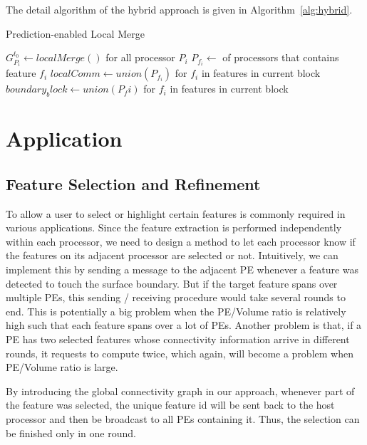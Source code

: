 \documentclass[10pt, conference, compsocconf]{IEEEtran}
\begin{document}
The detail algorithm of the hybrid approach is given in Algorithm~\ref{alg:hybrid}.
\begin{algorithm}
\caption{Prediction-enabled Local Merge}
\label{alg:hybrid}
	\begin{algorithmic}[1]
			\STATE $G_{P_i}^{t_0} \leftarrow localMerge()$ for all processor $P_i$
			\STATE $P_{f_i} \leftarrow$ of processors that contains feature $f_i$
			\STATE $localComm \leftarrow union(P_{f_i})$ for $f_i$ in features in current block
		\ELSE
			\STATE $boundary_block \leftarrow union(P_fi)$ for $f_i$ in features in current block
		\ENDIF
	\end{algorithmic}
\end{algorithm}

\section{Application}

\subsection{Feature Selection and Refinement}
To allow a user to select or highlight certain features is commonly required in various applications. 
Since the feature extraction is performed independently within each processor, 
we need to design a method to let each processor know if the features on its adjacent processor are selected or not.  
Intuitively, we can implement this by sending a message to the adjacent PE whenever a feature was detected to touch the surface boundary. But if the target feature spans over multiple PEs, this sending / receiving procedure would take several rounds to end. This is potentially a big problem when the PE/Volume ratio is relatively high such that each feature spans over a lot of PEs. Another problem is that, if a PE has two selected features whose connectivity information arrive in different rounds, it requests to compute twice, which again, will become a problem when PE/Volume ratio is large.

By introducing the global connectivity graph in our approach, whenever part of the feature was selected, the unique feature id will be sent back to the host processor and then be broadcast to all PEs containing it. Thus, the selection can be finished only in one round.
\end{document}
